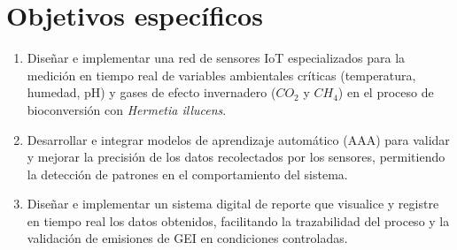 \section{Objetivos específicos}

\begin{enumerate}[label=\Roman*.]
    \item Diseñar e implementar una red de sensores IoT especializados para la medición en tiempo real de variables ambientales críticas (temperatura, humedad, pH) y gases de efecto invernadero ($CO_2$ y $CH_4$) en el proceso de bioconversión con \textit{Hermetia illucens}.
    \item Desarrollar e integrar modelos de aprendizaje automático (AAA) para validar y mejorar la precisión de los datos recolectados por los sensores, permitiendo la detección de patrones en el comportamiento del sistema.
    \item Diseñar e implementar un sistema digital de reporte que visualice y registre en tiempo real los datos obtenidos, facilitando la trazabilidad del proceso y la validación de emisiones de GEI en condiciones controladas.
\end{enumerate}
